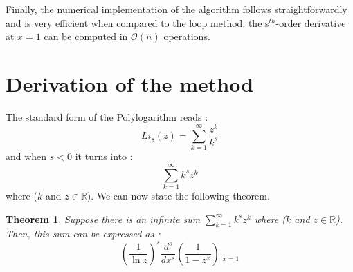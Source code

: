 \documentclass{amsart}
\newtheorem{theorem}{Theorem}
\numberwithin{equation}{section}
\newcommand{\beq}{\begin{equation}}
\newcommand{\eeq}{\end{equation}}
\begin{document}
Finally, the numerical implementation of the algorithm follows straightforwardly and is very efficient when compared to the loop method. the s$^{th}$-order derivative at $x=1$ can be computed in $\mathcal{O}(n)$ operations.

\section{Derivation of the method}
\label{se:interpretation}

The standard form of the Polylogarithm reads \cite{wolf}:
\beq
Li_{s}(z) = \sum_{k=1}^\infty \frac{z^k}{k^s} 
\label{1}
\eeq
and when $s<0$ it turns into :
\beq
\sum_{k=1}^\infty k^s z^k 
\label{5bis}
\eeq
where ($k$ and $z \in \mathbb{R}$). We can now state the following theorem.
\begin{theorem}
\label{the:1}
Suppose there is an infinite sum $\sum_{k=1}^{\infty} k^{s}z^{k}$ where ($k$ and $z \in \mathbb{R}$). Then, this sum can be expressed as :
\beq
(\frac{1}{\ln z})^{s}\frac{d^{s}}{dx^{s}}(\frac{1}{1-z^{x}})\bigg|_{x=1}
\label{6}
\eeq

\end{theorem}
\end{document}
